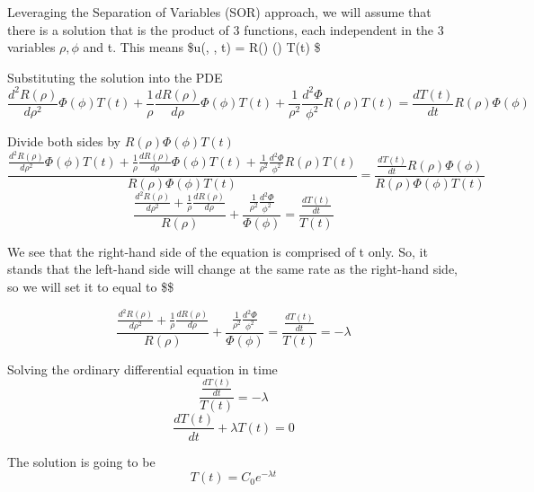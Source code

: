 \documentclass[11pt]{article}
\begin{document}
Leveraging the Separation of Variables (SOR) approach, we will assume
that there is a solution that is the product of 3 functions, each
independent in the 3 variables \(\rho, \phi\) and t. This means
\$u(\rho, \phi, t) = R(\rho) \Phi(\phi) T(t) \$

Substituting the solution into the PDE \begin{equation}
\frac {d^2 R(\rho)}{d \rho^2} \Phi(\phi) T(t) + \frac{1}{\rho} \frac {d R(\rho)}{d \rho} \Phi(\phi) T(t) + 
\frac{1}{\rho^2} \frac {d^2 \Phi}{ \phi^2} R(\rho) T(t) = \frac {d T(t)}{d t} R(\rho) \Phi(\phi) 
\end{equation}

Divide both sides by \(R(\rho) \Phi(\phi) T(t)\) \begin{equation}
\frac {\frac {d^2 R(\rho)}{d \rho^2} \Phi(\phi) T(t) + \frac{1}{\rho} \frac {d R(\rho)}{d \rho} \Phi(\phi) T(t) + 
\frac{1}{\rho^2} \frac {d^2 \Phi}{ \phi^2} R(\rho) T(t)} {R(\rho) \Phi(\phi) T(t)} = \frac{\frac {d T(t)}{d t} R(\rho) \Phi(\phi)} {{R(\rho) \Phi(\phi) T(t)}} 
\end{equation} \begin{equation}
\frac {\frac {d^2 R(\rho)}{d \rho^2} + \frac{1}{\rho} \frac{d R(\rho)}{d \rho}} {R(\rho) }  + 
\frac {\frac{1}{\rho^2} \frac {d^2 \Phi}{ \phi^2} } {\Phi(\phi)} = \frac{\frac {d T(t)}{d t}}{T(t)} 
\end{equation}

We see that the right-hand side of the equation is comprised of t only.
So, it stands that the left-hand side will change at the same rate as
the right-hand side, so we will set it to equal to \$\lambda \$

\begin{equation}
\frac {\frac {d^2 R(\rho)}{d \rho^2} + \frac{1}{\rho} \frac{d R(\rho)}{d \rho}} {R(\rho) }  + 
\frac {\frac{1}{\rho^2} \frac {d^2 \Phi}{ \phi^2} } {\Phi(\phi)} = \frac{\frac {d T(t)}{d t}}{T(t)} = - \lambda
\end{equation}

Solving the ordinary differential equation in time \begin{equation}
\frac{\frac {d T(t)}{d t}}{T(t)} = - \lambda
\end{equation} \begin{equation}
\frac {d T(t)}{d t} + \lambda T(t) = 0
\end{equation}

The solution is going to be \begin{equation}
T(t) = C_{0} e ^ {- \lambda t}
\end{equation}
\end{document}

